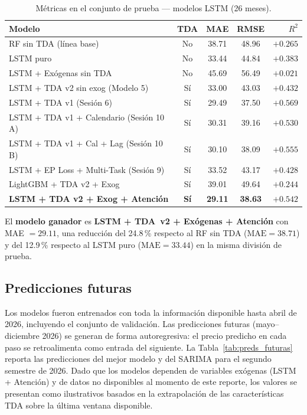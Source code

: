 \documentclass[12pt, a4paper]{article}
\newcommand{\mae}{\mathrm{MAE}}
\begin{document}
\begin{table}[H]
  \centering
  \caption{Métricas en el conjunto de prueba — modelos LSTM (26 meses).}
  \label{tab:resultados_lstm}
  \begin{tabular}{lcccr}
    \toprule
    \textbf{Modelo} & \textbf{TDA} & \textbf{MAE} & \textbf{RMSE} & \textbf{$R^2$} \\
    \midrule
    RF sin TDA (línea base)                    & No  & 38.71 & 48.96 & $+0.265$ \\
    LSTM puro                                  & No  & 33.44 & 44.84 & $+0.383$ \\
    LSTM + Exógenas sin TDA                    & No  & 45.69 & 56.49 & $+0.021$ \\
    \midrule
    LSTM + TDA v2 sin exog (Modelo 5)          & Sí  & 33.00 & 43.03 & $+0.432$ \\
    LSTM + TDA v1 (Sesión 6)                   & Sí  & 29.49 & 37.50 & $+0.569$ \\
    LSTM + TDA v1 + Calendario (Sesión 10 A)   & Sí  & 30.31 & 39.16 & $+0.530$ \\
    LSTM + TDA v1 + Cal + Lag (Sesión 10 B)    & Sí  & 30.10 & 38.09 & $+0.555$ \\
    LSTM + EP Loss + Multi-Task (Sesión 9)     & Sí  & 33.52 & 43.17 & $+0.428$ \\
    LightGBM + TDA v2 + Exog                   & Sí  & 39.01 & 49.64 & $+0.244$ \\
    \textbf{LSTM + TDA v2 + Exog + Atención}   & \textbf{Sí}  & \textbf{29.11} & \textbf{38.63} & $\mathbf{+0.542}$ \\
    \bottomrule
  \end{tabular}
\end{table}

El \textbf{modelo ganador} es \textbf{LSTM + TDA~v2 + Exógenas + Atención} con MAE $= 29.11$,
una reducción del 24.8\,\% respecto al RF sin TDA ($\mae = 38.71$) y del 12.9\,\% respecto al
LSTM puro ($\mae = 33.44$) en la misma división de prueba.

\subsection{Predicciones futuras}

Los modelos fueron entrenados con toda la información disponible hasta abril de 2026, incluyendo
el conjunto de validación. Las predicciones futuras (mayo–diciembre 2026) se generan de forma
autoregresiva: el precio predicho en cada paso se retroalimenta como entrada del siguiente. La
Tabla~\ref{tab:preds_futuras} reporta las predicciones del mejor modelo y del SARIMA para el
segundo semestre de 2026. Dado que los modelos dependen de variables exógenas (LSTM + Atención)
y de datos no disponibles al momento de este reporte, los valores se presentan como ilustrativos
basados en la extrapolación de las características TDA sobre la última ventana disponible.
\end{document}
